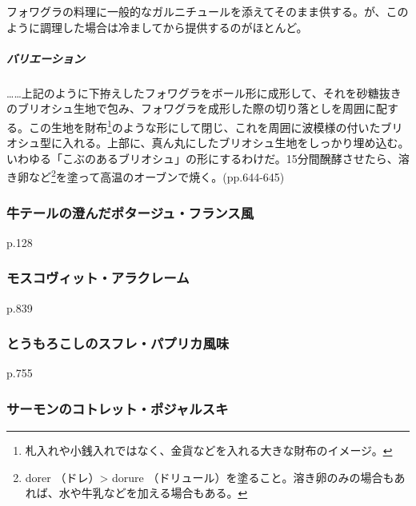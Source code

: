 フォワグラの料理に一般的なガルニチュールを添えてそのまま供する。が、このように調理した場合は冷ましてから提供するのがほとんど。

\hypertarget{ux30d0ux30eaux30a8ux30fcux30b7ux30e7ux30f3}{%
\subparagraph{バリエーション}\label{ux30d0ux30eaux30a8ux30fcux30b7ux30e7ux30f3}}

\ldots{}\ldots{}上記のように下拵えしたフォワグラをボール形に成形して、それを砂糖抜きのブリオシュ生地で包み、フォワグラを成形した際の切り落としを周囲に配する。この生地を財布\footnote{札入れや小銭入れではなく、金貨などを入れる大きな財布のイメージ。}のような形にして閉じ、これを周囲に波模様の付いたブリオシュ型に入れる。上部に、真ん丸にしたブリオシュ生地をしっかり埋め込む。いわゆる「こぶのあるブリオシュ」の形にするわけだ。15分間醗酵させたら、溶き卵など\footnote{dorer
  （ドレ）\textgreater{} dorure
  （ドリュール）を塗ること。溶き卵のみの場合もあれば、水や牛乳などを加える場合もある。}を塗って高温のオーブンで焼く。(pp.644-645)

\hypertarget{potage-queue-de-boeuf-a-la-francaise}{%
\subsubsection{牛テールの澄んだポタージュ・フランス風}\label{potage-queue-de-boeuf-a-la-francaise}}


p.128

\hypertarget{moscovite-a-la-creme}{%
\subsubsection{モスコヴィット・アラクレーム}\label{moscovite-a-la-creme}}


\href{ex.Bavarois\%20を料理名としてどう扱うか要検討}{}

p.839

\hypertarget{souffle-de-mais-au-paprika}{%
\subsubsection{とうもろこしのスフレ・パプリカ風味}\label{souffle-de-mais-au-paprika}}


p.755

\hypertarget{cotelettes-de-saumon-pojarski}{%
\subsubsection{サーモンのコトレット・ポジャルスキ}\label{cotelettes-de-saumon-pojarski}}

